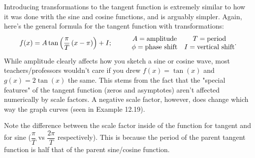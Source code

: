 \documentclass[../book.tex]{subfiles}
\begin{document}
Introducing transformations to the tangent function is extremely similar to how it was done with the sine and cosine functions, and is arguably simpler. Again, here's the general formula for the tangent function with transformations: $$f(x)=A\tan\left(\dfrac{\pi}{T}\left(x-\pi\right)\right)+I; \hspace{10mm} \begin{matrix} A=\text{amplitude} & T=\text{period} \\ \phi=\text{phase shift} & I=\text{vertical shift} \end{matrix}.$$
While amplitude clearly affects how you sketch a sine or cosine wave, most teachers/professors wouldn't care if you drew $f(x)=\tan⁡(x)$ and $g(x)=2\tan⁡(x)$ the same. This stems from the fact that the "special features" of the tangent function (zeros and asymptotes) aren't affected numerically by scale factors. A negative scale factor, however, does change which way the graph curves (seen in Example 12.19).

Note the difference between the scale factor inside of the function for tangent and for sine ($\dfrac{\pi}{T}$ vs $\dfrac{2\pi}{T}$ respectively). This is because the period of the parent tangent function is half that of the parent sine/cosine function.
\end{document}
